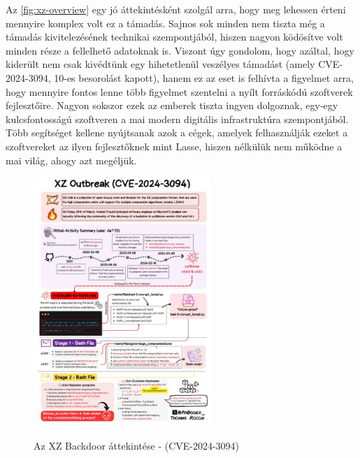 \documentclass[11pt]{article}
\begin{document}
Az \autoref{fig:xz-overview} egy jó áttekintésként szolgál arra, hogy meg lehessen érteni mennyire komplex volt ez a támadás. Sajnos sok minden nem tiszta még a támadás kivitelezésének technikai szempontjából, hiszen nagyon ködösítve volt minden része a fellelhető adatoknak is. Viszont úgy gondolom, hogy azáltal, hogy kiderült nem csak kivédtünk egy hihetetlenül veszélyes támadást (amely CVE-2024-3094, 10-es besorolást kapott), hanem ez az eset is felhívta a figyelmet arra, hogy mennyire fontos lenne több figyelmet szentelni a nyílt forráskódú szoftverek fejlesztőire. Nagyon sokszor ezek az emberek tiszta ingyen dolgoznak, egy-egy kulcsfontosságú szoftveren a mai modern digitális infrastruktúra szempontjából. Több segítséget kellene nyújtsanak azok a cégek, amelyek felhasználják ezeket a szoftvereket az ilyen fejlesztőknek mint Lasse, hiszen nélkülük nem működne a mai világ, ahogy azt megéljük.
\begin{figure}[H]
    \centering
    \includegraphics[width=0.6\textwidth]{assets/xz-backdoor-graphic-thomas-roccia-640x896.jpg}
    \caption{Az XZ Backdoor áttekintése - (CVE-2024-3094)}
    \label{fig:xz-overview}
    \cite{Roccia_2024}
    \FloatBarrier
\end{figure}
\end{document}
